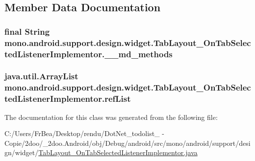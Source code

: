 \subsection{Member Data Documentation}
\hypertarget{classmono_1_1android_1_1support_1_1design_1_1widget_1_1_tab_layout___on_tab_selected_listener_implementor_69fdb2fbe45dfaa066204c67c40d6229}{
\subsubsection[{\_\-\_\-md\_\-methods}]{\setlength{\rightskip}{0pt plus 5cm}final String {\bf mono.android.support.design.widget.TabLayout\_\-OnTabSelectedListenerImplementor.\_\-\_\-md\_\-methods}}}
\label{classmono_1_1android_1_1support_1_1design_1_1widget_1_1_tab_layout___on_tab_selected_listener_implementor_69fdb2fbe45dfaa066204c67c40d6229}


\hypertarget{classmono_1_1android_1_1support_1_1design_1_1widget_1_1_tab_layout___on_tab_selected_listener_implementor_bc416c9b976f6bc6214e2d2f1c8edac7}{
\subsubsection[{refList}]{\setlength{\rightskip}{0pt plus 5cm}java.util.ArrayList {\bf mono.android.support.design.widget.TabLayout\_\-OnTabSelectedListenerImplementor.refList}}}
\label{classmono_1_1android_1_1support_1_1design_1_1widget_1_1_tab_layout___on_tab_selected_listener_implementor_bc416c9b976f6bc6214e2d2f1c8edac7}




The documentation for this class was generated from the following file:\begin{CompactItemize}
\item 
C:/Users/FrBea/Desktop/rendu/DotNet\_\-todolist\_ - Copie/2doo/\_\-2doo.Android/obj/Debug/android/src/mono/android/support/design/widget/\hyperlink{_tab_layout___on_tab_selected_listener_implementor_8java}{TabLayout\_\-OnTabSelectedListenerImplementor.java}\end{CompactItemize}
